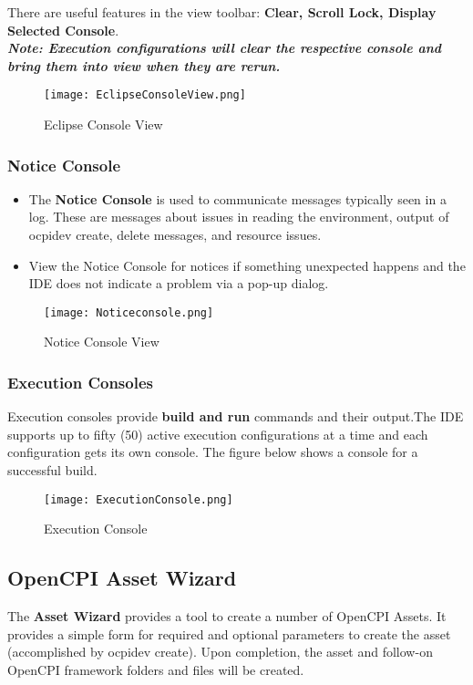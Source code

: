 There are useful features in the view toolbar: \textbf{Clear, Scroll Lock, Display Selected Console}.\\

\textbf{\emph{Note: Execution configurations will clear the respective console and bring them into view when they are rerun.}}\\

 \begin{figure}[h!]
    \centering
   	 \texttt{[image: EclipseConsoleView.png]}
     \caption{Eclipse Console View}
\end{figure}

\subsubsection{Notice Console}
\begin{itemize}
\item [] The \textbf{Notice Console} is used to communicate messages typically seen in a log. These are messages about issues in reading the environment, output of ocpidev create, delete messages, and resource issues.
\item [] View the Notice Console for notices if something unexpected happens and the IDE does not indicate a problem via a pop-up dialog.
\end{itemize}
\begin{figure}[h!]
    \centering
   	 \caption{Notice Console View}
   		 \texttt{[image: Noticeconsole.png]}
\end{figure}

\subsubsection{Execution Consoles}
Execution consoles provide \textbf{build and run} commands and their output.The IDE supports up to fifty (50) active execution configurations at a time and each configuration gets its own console. The figure below shows a console for a successful build.
\begin{figure}[h!]
	\centering
	\caption{Execution Console}\label{fig:ExecutionConsole.png}
	\texttt{[image: ExecutionConsole.png]}
 \end{figure}
\subsection{OpenCPI Asset Wizard}
The \textbf{Asset Wizard} provides a tool to create a number of OpenCPI Assets. It provides a simple form for required and optional parameters to create the asset (accomplished by ocpidev create). Upon completion, the asset and follow-on OpenCPI framework folders and files will be created. \\

